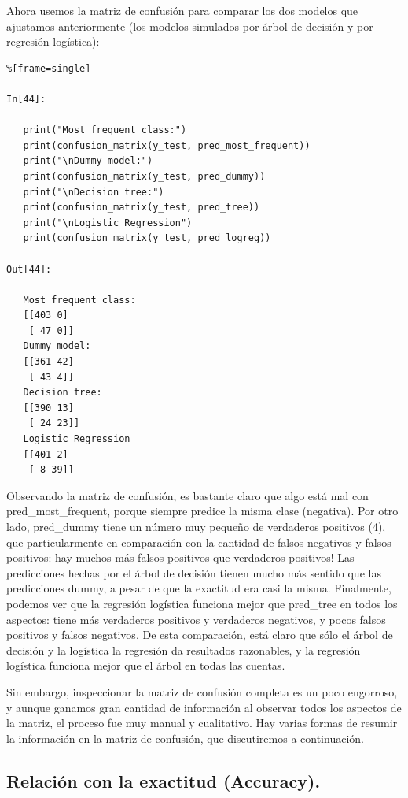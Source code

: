 {Ahora usemos la matriz de confusión para comparar los dos modelos que ajustamos anteriormente 
(los modelos simulados por  árbol de decisión y  por regresión logística):


\begin{lstlisting}%[frame=single]

In[44]:

   print("Most frequent class:")
   print(confusion_matrix(y_test, pred_most_frequent))
   print("\nDummy model:")
   print(confusion_matrix(y_test, pred_dummy))
   print("\nDecision tree:")
   print(confusion_matrix(y_test, pred_tree))
   print("\nLogistic Regression")
   print(confusion_matrix(y_test, pred_logreg))

Out[44]:

   Most frequent class:
   [[403 0]
    [ 47 0]]
   Dummy model:
   [[361 42]
    [ 43 4]]
   Decision tree:
   [[390 13]
    [ 24 23]]
   Logistic Regression
   [[401 2]
    [ 8 39]]

\end{lstlisting}


Observando la matriz de confusión, es bastante claro que algo está mal con
{\ttfamily pred\_most\_frequent}, porque siempre predice la misma clase (negativa). 
Por otro lado,  {\ttfamily pred\_dummy}  tiene un número muy pequeño de 
 verdaderos positivos  (4), que particularmente en comparación con
la cantidad de falsos negativos y falsos positivos:  hay muchos más falsos positivos
que  verdaderos positivos!   Las predicciones hechas por el árbol de decisión tienen  mucho más
sentido que las predicciones dummy, a pesar de que la exactitud era casi la misma. 
Finalmente, podemos ver que la regresión logística funciona mejor que  {\ttfamily pred\_tree} en todos los aspectos: tiene más verdaderos positivos   y  verdaderos  negativos,  y   pocos  falsos positivos y falsos negativos.    De esta comparación, está claro que sólo el árbol de decisión y la logística
la regresión da resultados razonables, y la regresión logística funciona mejor que
el árbol en todas las cuentas. 


Sin embargo, inspeccionar la matriz de confusión completa es un poco engorroso,
y aunque  ganamos   gran cantidad de información al observar todos los aspectos de la matriz,
el proceso fue muy manual y cualitativo.  Hay varias formas de resumir la información en la matriz de confusión, que discutiremos a continuación.


\subsection{Relación con la exactitud (Accuracy).} 

}
